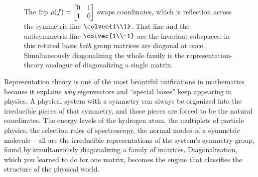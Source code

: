 \begin{figure}[H]
\centering
{}
\caption{The flip $\rho(f)=\protect\begin{bmatrix}0&1\\1&0\protect\end{bmatrix}$ swaps
coordinates, which is reflection across the symmetric line $\protect\colvec{1\\1}$.
That line and the antisymmetric line $\protect\colvec{1\\-1}$ are the invariant
subspaces: in this rotated basis \emph{both} group matrices are diagonal at once.
Simultaneously diagonalizing the whole family is the representation-theory analogue
of diagonalizing a single matrix.}
\label{ch37:fig-rep}
\end{figure}

\begin{aestheticbox}
Representation theory is one of the most beautiful unifications in mathematics
because it explains \emph{why} eigenvectors and ``special bases'' keep appearing in
physics. A physical system with a symmetry can always be organized into the
irreducible pieces of that symmetry, and those pieces are forced to be the natural
coordinates. The energy levels of the hydrogen atom, the multiplets of particle
physics, the selection rules of spectroscopy, the normal modes of a symmetric
molecule -- all are the irreducible representations of the system's symmetry group,
found by simultaneously diagonalizing a family of matrices. Diagonalization, which
you learned to do for one matrix, becomes the engine that classifies the structure
of the physical world.
\end{aestheticbox}

